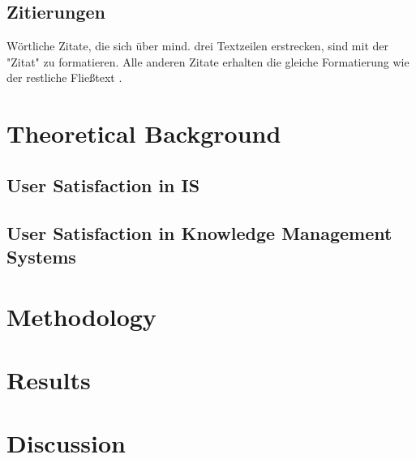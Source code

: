 \documentclass[
	ngerman,
	ruledheaders=section,%
	class=report,%
	thesis={type=bachelor},%
	accentcolor=1b,%
	custommargins=true,%
	marginpar=false,%
	parskip=half-,%
	fontsize=11pt,%
	DIV=14,
]{tudapub}
\begin{document}
\section{Zitierungen}
Wörtliche Zitate, die sich über mind. drei Textzeilen erstrecken, sind mit der "Zitat" zu formatieren. Alle anderen Zitate erhalten die gleiche Formatierung wie der restliche Fließtext \parencite{buxmann2015softwareindustrie}.

\chapter{Theoretical Background}
\section{User Satisfaction in IS}
\section{User Satisfaction in Knowledge Management Systems}



\chapter{Methodology}

\chapter{Results}

\chapter{Discussion}
\end{document}
